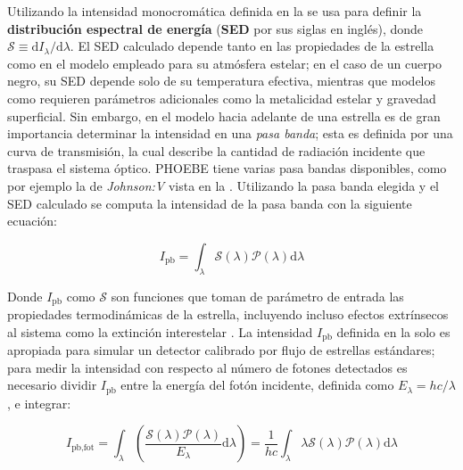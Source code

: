 Utilizando la intensidad monocromática definida en la
 se usa para definir la
\textbf{distribución espectral de energía} (\textbf{SED} por sus siglas en
inglés), donde $\mathcal{S} \equiv \mathrm{d}I_{\lambda}/\mathrm{d}\lambda$. El
SED calculado depende tanto en las propiedades de la estrella como en el modelo
empleado para su atmósfera estelar; en el caso de un cuerpo negro, su SED
depende solo de su temperatura efectiva, mientras que modelos como
 requieren parámetros adicionales como la
metalicidad estelar y gravedad superficial. Sin embargo, en el modelo hacia
adelante de una estrella es de gran importancia determinar la intensidad en una
\textit{pasa banda}; esta es definida por una curva de transmisión, la cual
describe la cantidad de radiación incidente que traspasa el sistema óptico.
PHOEBE tiene varias pasa bandas disponibles, como por ejemplo la de
\textit{Johnson:V} vista en la .
Utilizando la pasa banda elegida y el SED calculado se computa la intensidad de
la pasa banda con la siguiente ecuación:

\begin{eqfloat}
	\centering
	\begin{equation}
		I_{\textrm{pb}} = \int_{\lambda}{\mathcal{S}(\lambda) \mathcal{P}(\lambda)\textrm{d}\lambda}
	\end{equation}
	\blankcaption
	\label{ecuacionIntensidadPasabanda}
\end{eqfloat}

Donde $I_{\mathrm{pb}}$ como $\mathcal{S}$ son funciones que toman de parámetro
de entrada las propiedades termodinámicas de la estrella, incluyendo incluso
efectos extrínsecos al sistema como la extinción interestelar
. La intensidad
$I_{\mathrm{pb}}$ definida en la  solo
es apropiada para simular un detector calibrado por flujo de estrellas
estándares; para medir la intensidad con respecto al número de fotones
detectados es necesario dividir $I_{\mathrm{pb}}$ entre la energía del fotón
incidente, definida como $E_{\lambda} = hc/\lambda$, e integrar:

\begin{eqfloat}
	\centering
	\begin{equation}
		I_{\textrm{pb}, \textrm{fot}} = \int_{\lambda}{\left(\frac{\mathcal{S}(\lambda) \mathcal{P}(\lambda)}{E_{\lambda}}\textrm{d}\lambda \right)} = \frac{1}{hc} \int_{\lambda}{\lambda \mathcal{S}(\lambda) \mathcal{P}(\lambda) \textrm{d}\lambda}
	\end{equation}
\end{eqfloat}

